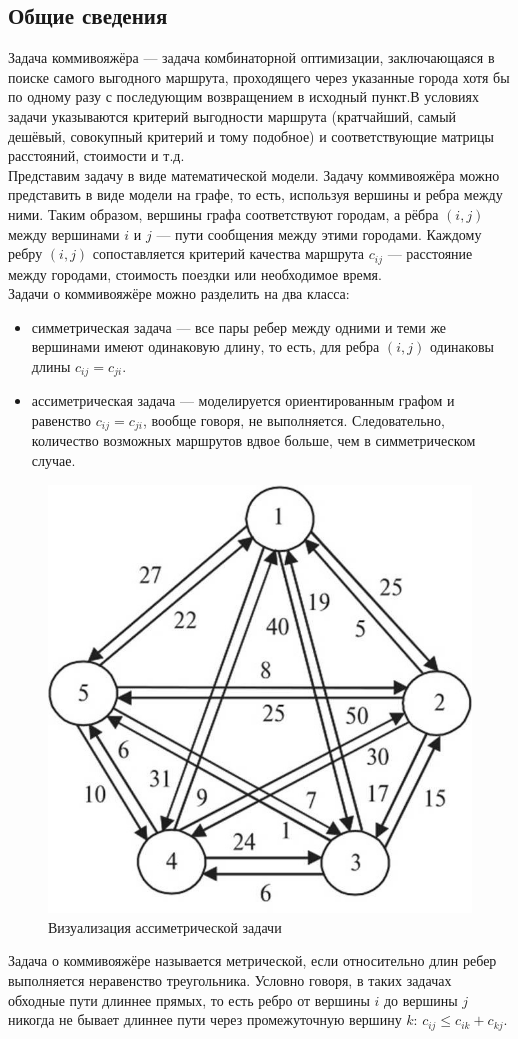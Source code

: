 \documentclass[14pt,a4paper]{scrartcl}
\begin{document}
	\subsection{Общие сведения}
	\begin{flushleft}
		Задача коммивояжёра --- задача комбинаторной оптимизации, заключающаяся в поиске самого выгодного маршрута, проходящего через указанные города хотя бы по одному разу с последующим возвращением в исходный пункт.В условиях задачи указываются критерий выгодности маршрута (кратчайший, самый дешёвый, совокупный критерий и тому подобное) и соответствующие матрицы расстояний, стоимости и т.д.
		\\
		Представим задачу в виде математической модели. Задачу коммивояжёра можно представить в виде модели на графе, то есть, используя вершины и ребра между ними. Таким образом, вершины графа соответствуют городам, а рёбра $(i, j)$ между вершинами $i$ и $j$ --- пути сообщения между этими городами. Каждому ребру $(i, j)$ сопоставляется критерий качества маршрута $c_{ij}$ --- расстояние между городами, стоимость поездки или необходимое время.
		\\
		Задачи о коммивояжёре можно разделить на два класса:
		\\
		\begin{itemize}
			\item симметрическая задача --- все пары ребер между одними и теми же вершинами имеют одинаковую длину, то есть, для ребра $(i, j)$ одинаковы длины $c_{ij} = c_{ji}$.
			\item ассиметрическая задача --- моделируется ориентированным графом и равенство $c_{ij} = c_{ji}$, вообще говоря, не выполняется. Следовательно, количество возможных маршрутов вдвое больше, чем в симметрическом случае.
		\end{itemize}
	\end{flushleft}
		\begin{figure}[H]
			\centering
			\includegraphics[width=0.5\linewidth]{task_example}
			\caption{Визуализация ассиметрической задачи}
		\end{figure}
	\begin{flushleft}
		Задача о коммивояжёре называется метрической,  если относительно длин ребер выполняется неравенство треугольника. Условно говоря, в таких задачах обходные пути длиннее прямых, то есть ребро от вершины $i$ до вершины $j$ никогда не бывает длиннее пути через промежуточную вершину $k$: $c_{ij} \leq c_{ik} + c_{kj}$.
	\end{flushleft}
\end{document}
